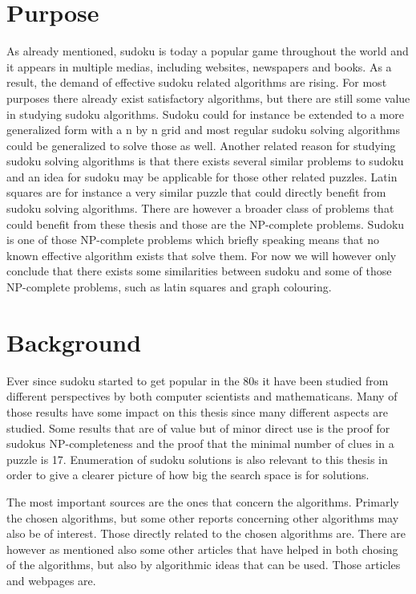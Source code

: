 \documentclass[a4paper,11pt]{kth-mag}
\begin{document}
\section{Purpose}
As already mentioned, sudoku is today a popular game throughout the world and it appears 
in multiple medias, including websites, newspapers and books. 
As a result, the demand of effective sudoku related algorithms are rising. 
For most purposes there already exist satisfactory algorithms, but there are 
still some value in studying sudoku algorithms. 
Sudoku could for instance be extended to a more generalized form with 
a n by n grid and most regular sudoku solving algorithms could be generalized 
to solve those as well. 
Another related reason for studying sudoku solving algorithms is that there exists 
several similar problems to sudoku and an idea for sudoku may be applicable for 
those other related puzzles. 
Latin squares are for instance a very similar puzzle that could directly benefit 
from sudoku solving algorithms. 
There are however a broader class of problems that could benefit from these thesis 
and those are the NP-complete problems. 
Sudoku is one of those NP-complete problems \cite{complexity} which briefly speaking means that 
no known effective algorithm exists that solve them. 
For now we will however only conclude that there exists some similarities between 
sudoku and some of those NP-complete problems, such as latin squares and graph colouring. 


\section{Background}
Ever since sudoku started to get popular in the 80s it have been studied from different perspectives by both computer scientists and mathematicans.
Many of those results have some impact on this thesis since many different aspects are studied. Some results that are of value but of minor direct use is the proof for sudokus NP-completeness \cite{complexity} and the proof that the minimal number of clues in a puzzle is 17.
\cite{17clueProof} Enumeration of sudoku solutions is also relevant to this thesis in order to give a clearer picture of how big the search space is for solutions. \cite{enumeration} 

The most important sources are the ones that concern the algorithms.
Primarly the chosen algorithms, but some other reports concerning other algorithms may also be of interest. Those directly related to the chosen algorithms are. \cite{techniques,boltzmann,stochastic,review} There are however as mentioned also some other articles that have helped in both chosing of the algorithms, but also by algorithmic ideas that can be used.
Those articles and webpages are. \cite{discrepancySearch,culturalSwarms,culturalSwarms}
\end{document}
